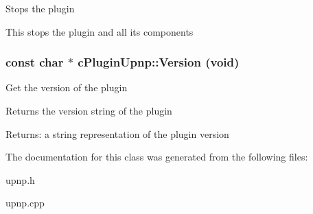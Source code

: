 Stops the plugin

This stops the plugin and all its components \hypertarget{classcPluginUpnp_584844bf459ec3eb7f6037f9cbb52fd5}{
\subsubsection[{Version}]{\setlength{\rightskip}{0pt plus 5cm}const char $\ast$ cPluginUpnp::Version (void)}}
\label{classcPluginUpnp_584844bf459ec3eb7f6037f9cbb52fd5}


Get the version of the plugin

Returns the version string of the plugin

\begin{Desc}
\item[Returns:]a string representation of the plugin version \end{Desc}


The documentation for this class was generated from the following files:\begin{CompactItemize}
\item 
upnp.h\item 
upnp.cpp\end{CompactItemize}
